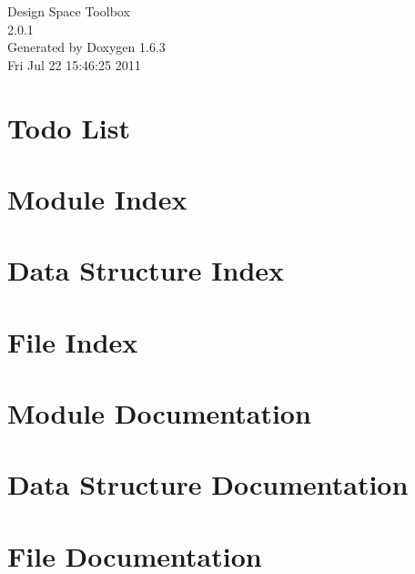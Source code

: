 \documentclass[a4paper]{book}
\begin{document}
\hypersetup{pageanchor=false}
\begin{titlepage}
\vspace*{7cm}
\begin{center}
{\Large Design Space Toolbox \\[1ex]\large 2.0.1 }\\
\vspace*{1cm}
{\large Generated by Doxygen 1.6.3}\\
\vspace*{0.5cm}
{\small Fri Jul 22 15:46:25 2011}\\
\end{center}
\end{titlepage}
\clearemptydoublepage
{}
\tableofcontents
\clearemptydoublepage
{}
\hypersetup{pageanchor=true}
\chapter{Todo List}
\label{todo}
\hypertarget{todo}{}

\chapter{Module Index}

\chapter{Data Structure Index}

\chapter{File Index}

\chapter{Module Documentation}



\chapter{Data Structure Documentation}









\chapter{File Documentation}














\printindex
\end{document}
